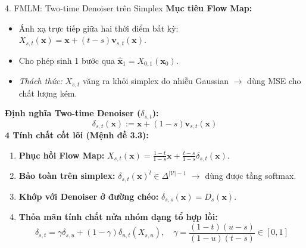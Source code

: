 \begin{frame}{4. FMLM: Two-time Denoiser trên Simplex}
    \textbf{Mục tiêu Flow Map:}
    \begin{itemize}
        \item Ánh xạ trực tiếp giữa hai thời điểm bất kỳ: $X_{s,t}(\mathbf{x}) = \mathbf{x} + (t - s)\mathbf{v}_{s,t}(\mathbf{x})$.
        \item Cho phép sinh 1 bước qua $\hat{\mathbf{x}}_1 = X_{0,1}(\mathbf{x}_0)$.
        \item \textit{Thách thức:} $X_{s,t}$ văng ra khỏi simplex do nhiễu Gaussian $\rightarrow$ dùng MSE cho chất lượng kém.
    \end{itemize}
    \vspace{0.2cm}
    \textbf{Định nghĩa Two-time Denoiser ($\delta_{s,t}$):}
    $$\delta_{s,t}(\mathbf{x}) := \mathbf{x} + (1 - s)\mathbf{v}_{s,t}(\mathbf{x})$$
    \textbf{4 Tính chất cốt lõi (Mệnh đề 3.3):}
    \begin{enumerate}
        \item \textbf{Phục hồi Flow Map:} $X_{s,t}(\mathbf{x}) = \frac{1 - t}{1 - s}\mathbf{x} + \frac{t - s}{1 - s}\delta_{s,t}(\mathbf{x})$.
        \item \textbf{Bảo toàn trên simplex:} $\delta_{s,t}(\mathbf{x})^l \in \Delta^{|\mathcal{V}|-1}$ $\rightarrow$ dùng được tầng softmax.
        \item \textbf{Khớp với Denoiser ở đường chéo:} $\delta_{s,s}(\mathbf{x}) = D_s(\mathbf{x})$.
        \item \textbf{Thỏa mãn tính chất nửa nhóm dạng tổ hợp lồi:}
        $$\delta_{s,t} = \gamma \delta_{s,u} + (1 - \gamma)\delta_{u,t}(X_{s,u}), \quad \gamma = \frac{(1-t)(u-s)}{(1-u)(t-s)} \in [0, 1]$$
    \end{enumerate}
\end{frame}

